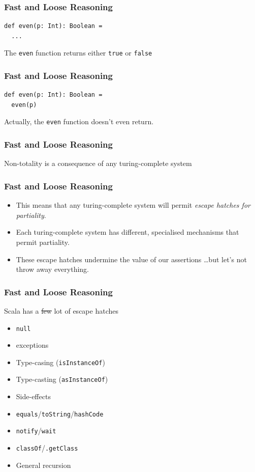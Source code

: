 \begin{frame}[fragile]
\frametitle{Fast and Loose Reasoning}
\begin{lstlisting}[style=scala]
def even(p: Int): Boolean = 
  ...
\end{lstlisting}
\begin{theorem}The \lstinline{even} function returns either \lstinline{true} or \lstinline{false}\end{theorem}
\end{frame}

\begin{frame}[fragile]
\frametitle{Fast and Loose Reasoning}
\begin{lstlisting}[style=scala]
def even(p: Int): Boolean = 
  even(p)
\end{lstlisting}
Actually, the \lstinline{even} function doesn't even return.
\end{frame}

\begin{frame}[fragile]
\frametitle{Fast and Loose Reasoning}
\begin{fact}Non-totality is a consequence of any turing-complete system\end{fact}
\end{frame}

\begin{frame}[fragile]
\frametitle{Fast and Loose Reasoning}
\begin{itemize}
  \item This means that any turing-complete system will permit \emph{escape hatches for partiality}.
  \item Each turing-complete system has different, specialised mechanisms that permit partiality.
  \item These escape hatches undermine the value of our assertions \ldots but let's not throw away everything.
\end{itemize}
\end{frame}

\begin{frame}[fragile]
\frametitle{Fast and Loose Reasoning}
\begin{block}{Scala has a \sout{few} lot of escape hatches}
\begin{itemize}
  \item \lstinline{null}
  \item exceptions
  \item Type-casing (\lstinline{isInstanceOf})
  \item Type-casting (\lstinline{asInstanceOf})
  \item Side-effects
  \item \lstinline{equals}/\lstinline{toString}/\lstinline{hashCode}
  \item \lstinline{notify}/\lstinline{wait}
  \item \lstinline{classOf}/\lstinline{.getClass}
  \item General recursion
\end{itemize}
\end{block}
\end{frame}

